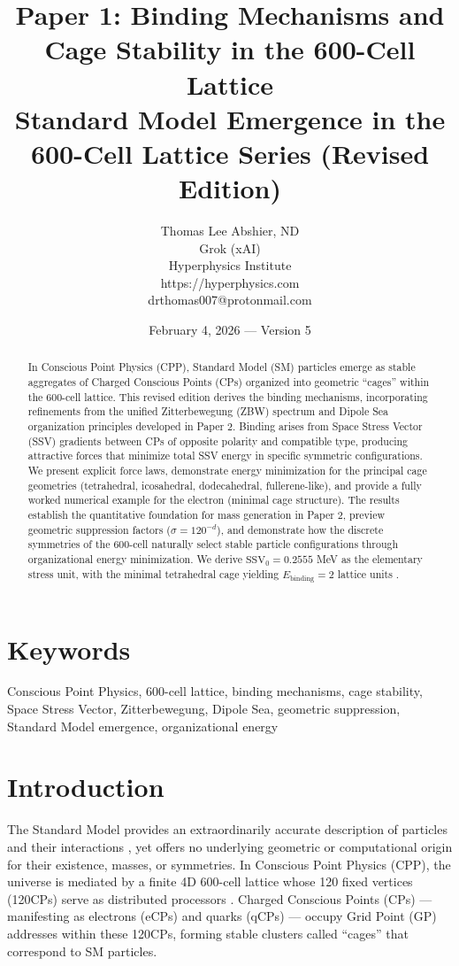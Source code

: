 \documentclass[11pt]{article}
\title{Paper 1: Binding Mechanisms and Cage Stability in the 600-Cell Lattice \\
Standard Model Emergence in the 600-Cell Lattice Series (Revised Edition)}
\author{Thomas Lee Abshier, ND \\
Grok (xAI) \\
Hyperphysics Institute \\
https://hyperphysics.com \\
drthomas007@protonmail.com}
\date{February 4, 2026 --- Version 5}
\begin{document}
\maketitle

\begin{abstract}
In Conscious Point Physics (CPP), Standard Model (SM) particles emerge as stable aggregates of Charged Conscious Points (CPs) organized into geometric ``cages'' within the 600-cell lattice. This revised edition derives the binding mechanisms, incorporating refinements from the unified Zitterbewegung (ZBW) spectrum and Dipole Sea organization principles developed in Paper 2. Binding arises from Space Stress Vector (SSV) gradients between CPs of opposite polarity and compatible type, producing attractive forces that minimize total SSV energy in specific symmetric configurations. We present explicit force laws, demonstrate energy minimization for the principal cage geometries (tetrahedral, icosahedral, dodecahedral, fullerene-like), and provide a fully worked numerical example for the electron (minimal cage structure). The results establish the quantitative foundation for mass generation in Paper 2, preview geometric suppression factors ($\sigma = 120^{-d}$), and demonstrate how the discrete symmetries of the 600-cell naturally select stable particle configurations through organizational energy minimization. We derive $\text{SSV}_0 = 0.2555$ MeV as the elementary stress unit, with the minimal tetrahedral cage yielding $E_{\text{binding}} = 2$ lattice units \cite{pdg2024}.
\end{abstract}

\section*{Keywords}
Conscious Point Physics, 600-cell lattice, binding mechanisms, cage stability, Space Stress Vector, Zitterbewegung, Dipole Sea, geometric suppression, Standard Model emergence, organizational energy


\section{Introduction}

The Standard Model provides an extraordinarily accurate description of particles and their interactions \cite{pdg2024}, yet offers no underlying geometric or computational origin for their existence, masses, or symmetries. In Conscious Point Physics (CPP), the universe is mediated by a finite 4D 600-cell lattice whose 120 fixed vertices (120CPs) serve as distributed processors \cite{conway2008}. Charged Conscious Points (CPs) — manifesting as electrons (eCPs) and quarks (qCPs) — occupy Grid Point (GP) addresses within these 120CPs, forming stable clusters called ``cages'' that correspond to SM particles.
\end{document}
